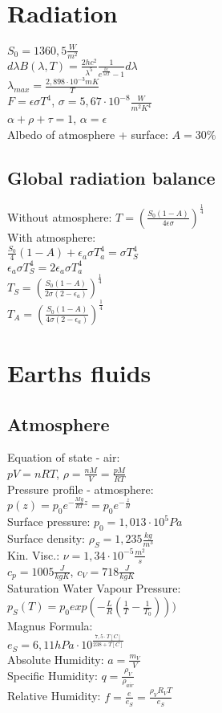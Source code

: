 \section*{Radiation}
$S_0=1360,5\frac{W}{m^2}$\\
$d\lambda B(\lambda,T)=\frac{2hc^2}{\lambda^5}\frac{1}{e^{\frac{hc}{\lambda k T}}-1}d\lambda$\\
$\lambda_{max}=\frac{2,898\cdot10^{-3}mK}{T}$\\
$F=\epsilon\sigma T^4$, $\sigma=5,67\cdot10^{-8}\frac{W}{m^2K^4}$\\
$\alpha + \rho + \tau = 1$, $\alpha = \epsilon$\\
Albedo of atmosphere + surface: $A = 30\%$
\subsection*{Global radiation balance} 
Without atmosphere: $T = \left(\frac{S_0(1-A)}{4\epsilon\sigma}\right)^{\frac{1}{4}}$\\
With atmosphere:\\
$\frac{S_0}{4}(1-A)+\epsilon_a\sigma T_a^4=\sigma T_S^4$\\
$\epsilon_a\sigma T_S^4=2\epsilon_a\sigma T_a^4$\\
$T_S = \left(\frac{S_0(1-A)}{2\sigma(2-\epsilon_a)}\right)^{\frac{1}{4}}$\\
$T_A = \left(\frac{S_0(1-A)}{4\sigma(2-\epsilon_a)}\right)^{\frac{1}{4}}$
\section*{Earths fluids}
\subsection*{Atmosphere}
Equation of state - air:\\
$pV=nRT$, $\rho = \frac{nM}{V}=\frac{pM}{RT}$\\
Pressure profile - atmosphere:\\
$p(z)=p_0 e^{-\frac{Mg}{RT}z}=p_0 e^{-\frac{z}{H}}$\\
Surface pressure: $p_0=1,013\cdot10^{5}Pa$\\
Surface density: $\rho_S = 1,235\frac{kg}{m^3}$\\
Kin. Visc.: $\nu=1,34\cdot10^{-5}\frac{m^2}{s}$\\
$c_p=1005\frac{J}{kgK}$, $c_V=718\frac{J}{kgK}$\\
Saturation Water Vapour Pressure:\\
$p_S(T)=p_0exp(-\frac{L}{R}(\frac{1}{T}-\frac{1}{T_0})))$\\
Magnus Formula:\\
$e_S=6,11hPa\cdot10^{\frac{7,5\cdot T[C]}{238 + T[C]}}$\\
Absolute Humidity: $a=\frac{m_V}{V}$\\
Specific Humidity: $q=\frac{\rho_V}{\rho_{air}}$\\
Relative Humidity: $f=\frac{e}{e_S}=\frac{\rho_V R_V T}{e_S}$\\

